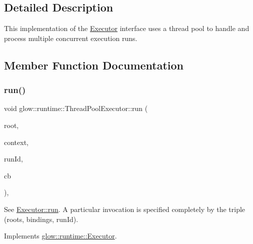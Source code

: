 \subsection{Detailed Description}
This implementation of the \hyperlink{classglow_1_1runtime_1_1_executor}{Executor} interface uses a thread pool to handle and process multiple concurrent execution runs. 

\subsection{Member Function Documentation}
\mbox{\label{classglow_1_1runtime_1_1_thread_pool_executor_a2f0225f88e53cf550e98db5b5037449e}} 
\subsubsection{\texorpdfstring{run()}{run()}}
{\footnotesize\ttfamily void glow\+::runtime\+::\+Thread\+Pool\+Executor\+::run (\begin{DoxyParamCaption}\item[{const \hyperlink{structglow_1_1runtime_1_1_d_a_g_node}{D\+A\+G\+Node} $\ast$}]{root,  }\item[{std\+::unique\+\_\+ptr$<$ \hyperlink{classglow_1_1_execution_context}{Execution\+Context} $>$}]{context,  }\item[{Run\+Identifier\+Ty}]{run\+Id,  }\item[{Result\+C\+B\+Ty}]{cb }\end{DoxyParamCaption})\hspace{0.3cm}{\ttfamily [override]}, {\ttfamily [virtual]}}

See \hyperlink{classglow_1_1runtime_1_1_executor_aeeef3270a1cdab1923bc75b02be16c07}{Executor\+::run}. A particular invocation is specified completely by the triple (roots, bindings, run\+Id). 

Implements \hyperlink{classglow_1_1runtime_1_1_executor_aeeef3270a1cdab1923bc75b02be16c07}{glow\+::runtime\+::\+Executor}.

\mbox{\label{classglow_1_1runtime_1_1_thread_pool_executor_ad77508bfa19d1ebaad7547b1bbce68f8}} 
